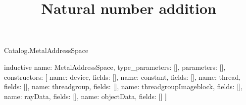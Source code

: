 \begin{lexlean}{Catalog.MetalAddressSpace}
\title{Natural number addition}
\begin{semanticmodule}
inductive{
  name: MetalAddressSpace,
  type_parameters: [],
  parameters: [],
  constructors: [
    {name: device, fields: []},
    {name: constant, fields: []},
    {name: thread, fields: []},
    {name: threadgroup, fields: []},
    {name: threadgroupImageblock, fields: []},
    {name: rayData, fields: []},
    {name: objectData, fields: []}
  ]
}
\end{semanticmodule}
\end{lexlean}

